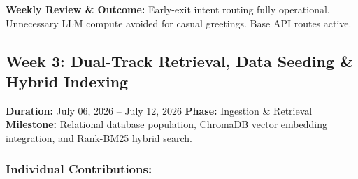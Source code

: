 \documentclass[11pt,a4paper]{article}
\begin{document}
\noindent \textbf{Weekly Review \& Outcome:} Early-exit intent routing fully operational. Unnecessary LLM compute avoided for casual greetings. Base API routes active.

\newpage
\subsection*{Week 3: Dual-Track Retrieval, Data Seeding \& Hybrid Indexing}
\noindent \textbf{Duration:} July 06, 2026 -- July 12, 2026 \hfill \textbf{Phase:} Ingestion \& Retrieval \\
\textbf{Milestone:} Relational database population, ChromaDB vector embedding integration, and Rank-BM25 hybrid search.

\subsubsection*{Individual Contributions:}
\end{document}
